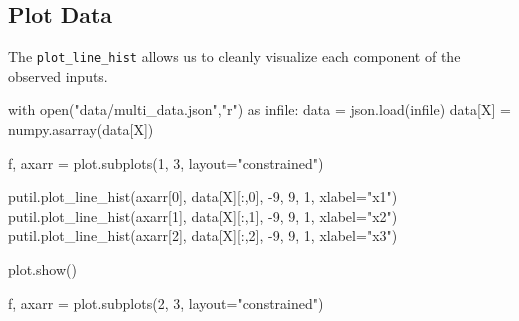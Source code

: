 \documentclass[
  letterpaper,
  DIV=11,
  numbers=noendperiod]{scrartcl}
\newenvironment{Shaded}{\begin{snugshade}}{\end{snugshade}}
\newcommand{\BuiltInTok}[1]{\textcolor[rgb]{0.00,0.23,0.31}{#1}}
\newcommand{\ControlFlowTok}[1]{\textcolor[rgb]{0.00,0.23,0.31}{#1}}
\newcommand{\DecValTok}[1]{\textcolor[rgb]{0.68,0.00,0.00}{#1}}
\newcommand{\ImportTok}[1]{\textcolor[rgb]{0.00,0.46,0.62}{#1}}
\newcommand{\NormalTok}[1]{\textcolor[rgb]{0.00,0.23,0.31}{#1}}
\newcommand{\OperatorTok}[1]{\textcolor[rgb]{0.37,0.37,0.37}{#1}}
\newcommand{\StringTok}[1]{\textcolor[rgb]{0.13,0.47,0.30}{#1}}
\begin{document}
\subsection{Plot Data}\label{plot-data}

The \texttt{plot\_line\_hist} allows us to cleanly visualize each
component of the observed inputs.

\begin{Shaded}
\begin{Highlighting}[]
\ControlFlowTok{with} \BuiltInTok{open}\NormalTok{(}\StringTok{"data/multi\_data.json"}\NormalTok{,}\StringTok{"r"}\NormalTok{) }\ImportTok{as}\NormalTok{ infile:}
\NormalTok{  data }\OperatorTok{=}\NormalTok{ json.load(infile)}
\NormalTok{data[}\StringTok{\textquotesingle{}X\textquotesingle{}}\NormalTok{] }\OperatorTok{=}\NormalTok{ numpy.asarray(data[}\StringTok{\textquotesingle{}X\textquotesingle{}}\NormalTok{])}


\NormalTok{f, axarr }\OperatorTok{=}\NormalTok{ plot.subplots(}\DecValTok{1}\NormalTok{, }\DecValTok{3}\NormalTok{, layout}\OperatorTok{=}\StringTok{"constrained"}\NormalTok{)}

\NormalTok{putil.plot\_line\_hist(axarr[}\DecValTok{0}\NormalTok{], data[}\StringTok{\textquotesingle{}X\textquotesingle{}}\NormalTok{][:,}\DecValTok{0}\NormalTok{], }\OperatorTok{{-}}\DecValTok{9}\NormalTok{, }\DecValTok{9}\NormalTok{, }\DecValTok{1}\NormalTok{, xlabel}\OperatorTok{=}\StringTok{"x1"}\NormalTok{)}
\NormalTok{putil.plot\_line\_hist(axarr[}\DecValTok{1}\NormalTok{], data[}\StringTok{\textquotesingle{}X\textquotesingle{}}\NormalTok{][:,}\DecValTok{1}\NormalTok{], }\OperatorTok{{-}}\DecValTok{9}\NormalTok{, }\DecValTok{9}\NormalTok{, }\DecValTok{1}\NormalTok{, xlabel}\OperatorTok{=}\StringTok{"x2"}\NormalTok{)}
\NormalTok{putil.plot\_line\_hist(axarr[}\DecValTok{2}\NormalTok{], data[}\StringTok{\textquotesingle{}X\textquotesingle{}}\NormalTok{][:,}\DecValTok{2}\NormalTok{], }\OperatorTok{{-}}\DecValTok{9}\NormalTok{, }\DecValTok{9}\NormalTok{, }\DecValTok{1}\NormalTok{, xlabel}\OperatorTok{=}\StringTok{"x3"}\NormalTok{)}

\NormalTok{plot.show()}

\NormalTok{f, axarr }\OperatorTok{=}\NormalTok{ plot.subplots(}\DecValTok{2}\NormalTok{, }\DecValTok{3}\NormalTok{, layout}\OperatorTok{=}\StringTok{"constrained"}\NormalTok{)}


\end{Highlighting}
\end{Shaded}
\end{document}
